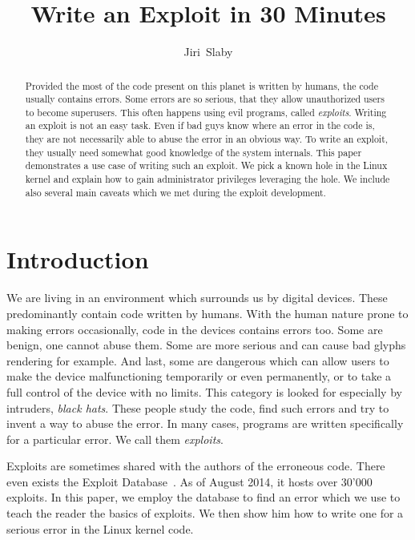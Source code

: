 \documentclass[10pt]{llncs}
\begin{document}
\title{Write an Exploit in 30 Minutes}
\author{Jiri~Slaby}

\maketitle

\begin{abstract}
  Provided the most of the code present on this planet is written by humans,
  the code usually contains errors. Some errors are so serious, that they
  allow unauthorized users to become superusers. This often happens using evil
  programs, called \emph{exploits}. Writing an exploit is not an easy task.
  Even if bad guys know where an error in the code is, they are not
  necessarily able to abuse the error in an obvious way. To write an exploit,
  they usually need somewhat good knowledge of the system internals. This
  paper demonstrates a use case of writing such an exploit. We pick a known
  hole in the Linux kernel and explain how to gain administrator privileges
  leveraging the hole. We include also several main caveats which we met
  during the exploit development.
\end{abstract}

\section{Introduction} \label{sec:intro}
We are living in an environment which surrounds us by digital devices. These
predominantly contain code written by humans. With the human nature prone to
making errors occasionally, code in the devices contains errors too. Some are
benign, one cannot abuse them. Some are more serious and can cause bad glyphs
rendering for example. And last, some are dangerous which can allow users to
make the device malfunctioning temporarily or even permanently, or to take a
full control of the device with no limits. This category is looked for
especially by intruders, \emph{black hats}. These people study the code, find
such errors and try to invent a way to abuse the error. In many cases,
programs are written specifically for a particular error. We call them
\emph{exploits}.

Exploits are sometimes shared with the authors of the erroneous code.  There
even exists the Exploit Database~\cite{edb}. As of August 2014, it hosts over
30'000 exploits.  In this paper, we employ the database to find an error which
we use to teach the reader the basics of exploits. We then show him how to
write one for a serious error in the Linux kernel code.
\end{document}
